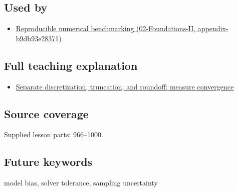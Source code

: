 \subsection{Used by}\label{used-by}

\begin{itemize}
\tightlist
\item
  \href{}{Reproducible numerical benchmarking (02-Foundations-II, appendix-b9db93e28371)}
\end{itemize}

\subsection{Full teaching explanation}\label{full-teaching-explanation}

\begin{itemize}
\tightlist
\item
  \href{Continuous\%20Notes/Computing\%20Foundations\%20-\%20From\%20Bits\%20to\%20C++\%20and\%20Systems\%20APIs\#Separate\%20discretization,\%20truncation,\%20and\%20roundoff;\%20measure\%20convergence}{Separate discretization, truncation, and roundoff; measure convergence}
\end{itemize}

\subsection{Source coverage}\label{source-coverage}

Supplied lesson parts: 966--1000.

\subsection{Future keywords}\label{future-keywords}

model bias, solver tolerance, sampling uncertainty
